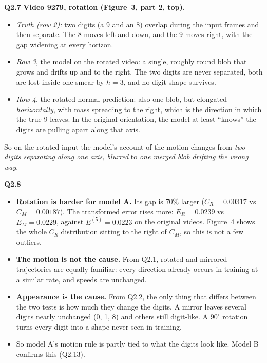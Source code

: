 \documentclass[11pt]{article}
\newcommand{\q}[1]{\par\medskip\noindent\textbf{#1}\quad}
\begin{document}
\q{Q2.7}
\textbf{Video 9279, rotation (Figure~3, part 2, top).}
\begin{itemize}
  \item \emph{Truth (row 2):} two digits (a 9 and an 8) overlap during the input frames and then separate. The 8 moves left and down, and the 9 moves right, with the gap widening at every horizon.
  \item \emph{Row 3}, the model on the rotated video: a single, roughly round blob that grows and drifts up and to the right. The two digits are never separated, both are lost inside one smear by $h=3$, and no digit shape survives.
  \item \emph{Row 4}, the rotated normal prediction: also one blob, but elongated \emph{horizontally}, with mass spreading to the right, which is the direction in which the true 9 leaves. In the original orientation, the model at least ``knows'' the digits are pulling apart along that axis.
\end{itemize}
So on the rotated input the model's account of the motion changes from \emph{two digits separating along one axis, blurred} to \emph{one merged blob drifting the wrong way}.

\q{Q2.8}
\begin{itemize}
  \item \textbf{Rotation is harder for model A.} Its gap is 70\% larger ($C_R=0.00317$ vs $C_M=0.00187$). The transformed error rises more: $E_R=0.0239$ vs $E_M=0.0229$, against $E^{(5)}=0.0223$ on the original videos. Figure~4 shows the whole $C_R$ distribution sitting to the right of $C_M$, so this is not a few outliers.
  \item \textbf{The motion is not the cause.} From Q2.1, rotated and mirrored trajectories are equally familiar: every direction already occurs in training at a similar rate, and speeds are unchanged.
  \item \textbf{Appearance is the cause.} From Q2.2, the only thing that differs between the two tests is how much they change the digits. A mirror leaves several digits nearly unchanged (0, 1, 8) and others still digit-like. A $90^\circ$ rotation turns every digit into a shape never seen in training.
  \item So model A's motion rule is partly tied to what the digits look like. Model B confirms this (Q2.13).
\end{itemize}

\begin{table}[H]
\centering\small
\caption{Faster motion (test split, $t=1$). $E^{(2)}$ uses the first two horizons only.}
\end{table}
\end{document}
